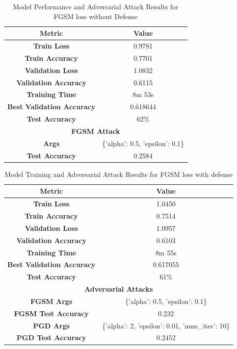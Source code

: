 \documentclass{article}
\begin{document}
\begin{table}[H]
    \centering
    \begin{tabular}{|c|c|}
    \hline
    \textbf{Metric} & \textbf{Value} \\
    \hline
    \textbf{Train Loss} & 0.9781 \\
    \textbf{Train Accuracy} & 0.7701 \\
    \hline
    \textbf{Validation Loss} & 1.0832 \\
    \textbf{Validation Accuracy} & 0.6115 \\
    \hline
    \textbf{Training Time} & 8m 53s \\
    \hline
    \textbf{Best Validation Accuracy} & 0.618644 \\
    \hline
    \textbf{Test Accuracy} & 62\% \\
    \hline
    \multicolumn{2}{|c|}{\textbf{FGSM Attack}} \\
    \hline
    \textbf{Args} & \{'alpha': 0.5, 'epsilon': 0.1\} \\
    \textbf{Test Accuracy} & 0.2584 \\
    \hline
    \end{tabular}
    \caption{Model Performance and Adversarial Attack Results for FGSM loss without Defense}
\end{table}

\begin{table}[H]
    \centering
    \begin{tabular}{|c|c|}
    \hline
    \textbf{Metric} & \textbf{Value} \\
    \hline
    \textbf{Train Loss} & 1.0450 \\
    \textbf{Train Accuracy} & 0.7514 \\
    \hline
    \textbf{Validation Loss} & 1.0957 \\
    \textbf{Validation Accuracy} & 0.6103 \\
    \hline
    \textbf{Training Time} & 8m 55s \\
    \hline
    \textbf{Best Validation Accuracy} & 0.617055 \\
    \hline
    \textbf{Test Accuracy} & 61\% \\
    \hline
    \multicolumn{2}{|c|}{\textbf{Adversarial Attacks}} \\
    \hline
    \textbf{FGSM Args} & \{'alpha': 0.5, 'epsilon': 0.1\} \\
    \textbf{FGSM Test Accuracy} & 0.232 \\
    \hline
    \textbf{PGD Args} & \{'alpha': 2, 'epsilon': 0.01, 'num\_iter': 10\} \\
    \textbf{PGD Test Accuracy} & 0.2452 \\
    \hline
    \end{tabular}
    \caption{Model Training and Adversarial Attack Results for FGSM loss with defense}
\end{table}
\end{document}
